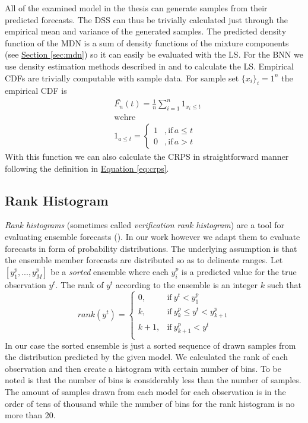 \documentclass[12pt,a4paper,twoside]{scrartcl}
\numberwithin{equation}{section}
\newcommand{\refsec}[1]{\hyperref[#1]{Section \ref*{#1}}}
\renewcommand*{\refeq}[1]{\hyperref[#1]{Equation \ref*{#1}}}
\begin{document}
All of the examined model in the thesis can generate samples from their predicted forecasts. The DSS can thus be trivially calculated just through the empirical mean and variance of the generated samples. The predicted density function of the MDN is a sum of density functions of the mixture components (see \refsec{sec:mdn}) so it can easily be evaluated with the LS. For the BNN we use density estimation methods described in \cite{silverman1986} and \cite{scott2015} to calculate the LS. Empirical CDFs are trivially computable with sample data. For sample set \(\{x_i\}_i=1^n\) the empirical CDF is
\begin{align}
  &\bar{F_n}(t)=\frac{1}{n}\sum_{i=1}^n1_{x_i\leq t} \\
  &\text{wehre} \\
  &1_{a\leq t} =
        \begin{cases}
          1 &,\text{if}\, a \leq t \\
          0 &,\text{if}\, a > t 
        \end{cases}
\end{align}
With this function we can also calculate the CRPS in straightforward manner following the definition in \refeq{eq:crps}.
\subsection{Rank Histogram}\label{sec:rank-hist}

\emph{Rank histograms} (sometimes called \emph{verification rank histogram}) are a tool for evaluating ensemble forecasts (\cite{hamill2001}). In our work however we adapt them to evaluate forecasts in form of probability distributions. The underlying assumption is that the ensemble member forecasts are distributed so as to delineate ranges. Let \([y_1^p,..., y_M^p]\) be a \emph{sorted} ensemble where each \(y_i^p\) is a predicted value for the true observation \(y^t\). The rank of \(y^t\) according to the ensemble is an integer \(k\) such that
\begin{equation}  
  rank(y^t)=
  \begin{cases}
    0,   & \text{if}\  y^t < y_1^p \\
    k,   & \text{if}\  y_{k}^p \leq y^t < y_{k+1}^p  \\
    k+1, & \text{if}\  y_{k+1}^p <  y^t  \\
  \end{cases}
\end{equation}
In our case the sorted ensemble is just a sorted sequence of drawn samples from the distribution predicted by the given model. We calculated the rank of each observation and then create a histogram with certain number of bins. To be noted is that the number of bins is considerably less than the number of samples. The amount of samples drawn from each model for each observation is in the order of tens of thousand while the number of bins for the rank histogram is no more than 20.
\end{document}
